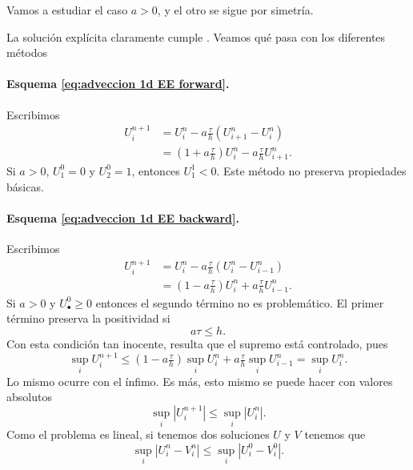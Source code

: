 Vamos a estudiar el caso $a > 0$, y el otro se sigue por simetría.

La solución explícita claramente cumple . Veamos qué pasa con los diferentes métodos
\paragraph{Esquema \eqref{eq:adveccion 1d EE forward}.} Escribimos
\begin{align*}
    U_i^{n+1}
     & = U_i^n - a \tfrac{\tau}{h} (U_{i+1}^n - U_i^n)               \\
     & = (1 + a\tfrac{\tau}{h}) U_i^n - a \tfrac{\tau}{h} U_{i+1}^n.
\end{align*}
Si $a > 0$, $U_1^0 = 0$ y $U_2^0 = 1$, entonces $U_1^1 < 0$. Este método no preserva propiedades básicas.

\paragraph{Esquema \eqref{eq:adveccion 1d EE backward}.}
Escribimos
\begin{align*}
    U_i^{n+1}
     & = U_i^n - a \tfrac{\tau}{h} (U_{i}^n - U_{i-1}^n)             \\
     & = (1 - a\tfrac{\tau}{h}) U_i^n + a \tfrac{\tau}{h} U_{i-1}^n.
\end{align*}
Si $a > 0$ y $U_\bullet^0 \ge 0$ entonces el segundo término no es problemático. El primer término preserva la positividad si
\begin{equation}
    \tag{A-CFL}
    \label{eq:adveccion 1d CFL}
    a\tau \le h.
\end{equation}
Con esta condición tan inocente, resulta que el supremo está controlado, pues
\begin{equation*}
    \sup_i U_i^{n+1} \le (1 - a \tfrac{\tau}{h}) \sup_i U_i^n + a \tfrac{\tau}{h} \sup_i U_{i-1}^n = \sup_i U_i^{n}.
\end{equation*}
Lo mismo ocurre con el ínfimo. Es más, esto mismo se puede hacer con valores absolutos
\begin{equation*}
    \sup_i |U_i^{n+1}| \le \sup_i |U_i^{n}|.
\end{equation*}
Como el problema es lineal, si tenemos dos soluciones $U$ y $V$ tenemos que
\begin{equation*}
    \sup_i |U_i^{n} - V_i^n| \le \sup_i |U_i^0 - V_i^0|.
\end{equation*}

